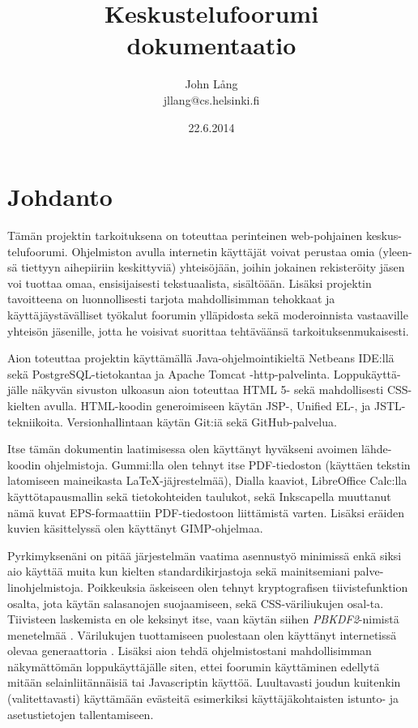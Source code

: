 \documentclass[11pt]{article}
\title{\textbf{Keskustelufoorumi}\\ \small{dokumentaatio}}
\author{John Lång\\ \small{jllang@cs.helsinki.fi}}
\date{22.6.2014}
\begin{document}
\pagestyle{empty}
\maketitle
\thispagestyle{empty}

\newpage
\tableofcontents

\newpage
\thispagestyle{plain}

\section{Johdanto}
	Tämän projektin tarkoituksena on toteuttaa perinteinen web-pohjainen keskus-telufoorumi. Ohjelmiston
	avulla internetin käyttäjät voivat perustaa omia (yleen-sä tiettyyn aihepiiriin keskittyviä) yhteisöjään,
	joihin jokainen rekisteröity jäsen voi tuottaa omaa, ensisijaisesti tekstuaalista, sisältöään. Lisäksi
	projektin tavoitteena on luonnollisesti tarjota mahdollisimman tehokkaat ja käyttäjäystävälliset työkalut
	foorumin ylläpidosta sekä moderoinnista vastaaville yhteisön jäsenille, jotta he voisivat suorittaa
	tehtäväänsä tarkoituksenmukaisesti.
		
	Aion toteuttaa projektin käyttämällä Java-ohjelmointikieltä Netbeans IDE:llä sekä  PostgreSQL-tietokantaa 
	ja Apache Tomcat -http-palvelinta. Loppukäyttä-jälle näkyvän sivuston ulkoasun aion toteuttaa HTML 5- sekä
	mahdollisesti CSS-kielten avulla. HTML-koodin generoimiseen käytän JSP-, Unified EL-, ja JSTL- tekniikoita.
	Versionhallintaan käytän Git:iä sekä GitHub-palvelua.
	
	Itse tämän dokumentin laatimisessa olen käyttänyt hyväkseni avoimen lähde-koodin ohjelmistoja.
	Gummi:lla olen tehnyt itse PDF-tiedoston (käyttäen tekstin latomiseen maineikasta \LaTeX-jäjrestelmää),
	Dialla kaaviot, LibreOffice Calc:lla käyttötapausmallin sekä tietokohteiden taulukot, sekä Inkscapella
	muuttanut nämä kuvat EPS-formaattiin PDF-tiedostoon liittämistä varten. Lisäksi eräiden kuvien käsittelyssä
	olen käyttänyt GIMP-ohjelmaa.
	
	Pyrkimyksenäni on pitää järjestelmän vaatima asennustyö minimissä enkä siksi aio käyttää muita kun kielten
	standardikirjastoja sekä mainitsemiani palve-linohjelmistoja. Poikkeuksia äskeiseen olen tehnyt 
	kryptografisen tiivistefunktion osalta, jota käytän salasanojen suojaamiseen, sekä CSS-väriliukujen osal-ta.
	Tiivisteen laskemista en ole keksinyt itse, vaan käytän siihen \emph{PBKDF2}-nimistä menetelmää \cite{a}.
	Värilukujen tuottamiseen puolestaan olen käyttänyt internetissä olevaa generaattoria \cite{b}.	Lisäksi
	aion tehdä ohjelmistostani	mahdollisimman näkymättömän loppukäyttäjälle siten, ettei foorumin käyttäminen
	edellytä mitään selainliitännäisiä tai Javascriptin käyttöä. Luultavasti joudun kuitenkin (valitettavasti) 
	käyttämään evästeitä esimerkiksi käyttäjäkohtaisten istunto- ja	asetustietojen tallentamiseen.
	
\end{document}

